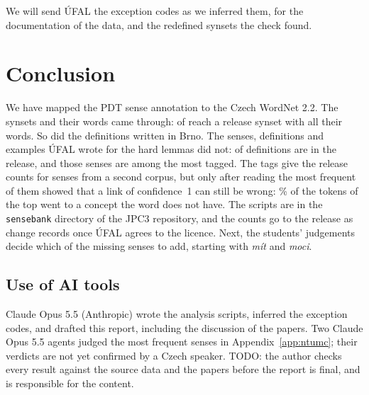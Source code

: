 \documentclass[a4paper,12pt]{article}
\begin{document}
We will send ÚFAL the exception codes as we inferred them, for the
documentation of the data, and the redefined synsets the check found.

\section{Conclusion}

We have mapped the PDT sense annotation to the Czech WordNet 2.2.  The
synsets and their words came through:  of
 reach a release synset with all their words.  So
did the definitions written in Brno.  The senses, definitions and
examples ÚFAL wrote for the hard lemmas did not:
 of  definitions are in the
release, and those senses are among the most tagged.  The tags give the
release counts for  senses from a second corpus, but
only after reading the most frequent of them showed that a link of
confidence~1 can still be wrong: \% of the
tokens of the top  went to a concept the word
does not have.
The scripts are in the \texttt{sensebank} directory of the JPC3
repository, and the counts go to the release as change records once ÚFAL
agrees to the licence.  Next, the students' judgements decide which of
the missing senses to add, starting with \textit{mít} and \textit{moci}.

\subsection*{Use of AI tools}

Claude Opus 5.5 (Anthropic) wrote the analysis scripts, inferred the
exception codes, and drafted this report, including the discussion of
the papers.  Two Claude Opus 5.5 agents judged the
 most frequent senses in Appendix~\ref{app:ntumc};
their verdicts are not yet confirmed by a Czech speaker.  TODO: the author checks every result against the source data
and the papers before the report is final, and is responsible for the
content.

\end{document}
